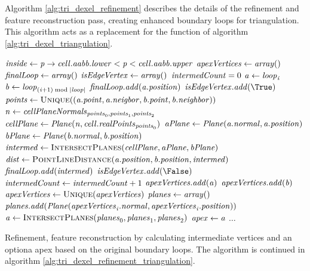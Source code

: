 Algorithm \ref{alg:tri_dexel_refinement} describes the details of the refinement and feature reconstruction pass, creating enhanced boundary loops for triangulation.
This algorithm acts as a replacement for the  function of algorithm \ref{alg:tri_dexel_triangulation}.
%
\begin{algorithm}
	\centering
	\begin{algorithmic}[1]
			\State $\mathit{inside} \gets \mathit{p} \rightarrow \mathit{cell}.\mathit{aabb}.\mathit{lower} < \mathit{p} < \mathit{cell}.\mathit{aabb}.\mathit{upper}$
			\State $\mathit{apexVertices} \gets \mathit{array}()$
			\State $\mathit{finalLoop} \gets \mathit{array}()$
			\State $\mathit{isEdgeVertex} \gets \mathit{array}()$
			\State $\mathit{intermedCount} = 0$
				\State $\mathit{a} \gets \mathit{loop}_{\mathit{i}}$
				\State $\mathit{b} \gets \mathit{loop}_{(\mathit{i} + 1) \bmod |\mathit{loop}|}$
				\State $\mathit{finalLoop}.\mathit{add}(\mathit{a}.\mathit{position})$
				\State $\var{isEdgeVertex}.\var{add}(\True)$
				\State $\var{points} \gets \Call{Unique}{(\var{a}.\var{point}, \var{a}.\var{neigbor}, \var{b}.\var{point}, \var{b}.\var{neighbor})}$
				\State $\mathit{n} \gets \mathit{cellPlaneNormals}_{\mathit{points}_0, \mathit{points}_1, \mathit{points}_2}$
				\State $\mathit{cellPlane} \gets \mathit{Plane}(\mathit{n}, \mathit{cell}.\mathit{realPoints}_{\mathit{points}_0})$
				\State $\mathit{aPlane} \gets \mathit{Plane}(\mathit{a}.\mathit{normal}, \mathit{a}.\mathit{position})$
				\State $\mathit{bPlane} \gets \mathit{Plane}(\mathit{b}.\mathit{normal}, \mathit{b}.\mathit{position})$
				\State $\var{intermed} \gets \Call{IntersectPlanes}{\var{cellPlane}, \var{aPlane}, \var{bPlane}}$
					\State $\var{dist} \gets \Call{PointLineDistance}{\var{a}.\var{position}, \var{b}.\var{position}, \var{intermed}}$
						\State $\mathit{finalLoop}.\mathit{add}(\mathit{intermed})$
						\State $\var{isEdgeVertex}.\var{add}(\False)$
						\State $\mathit{intermedCount} \gets \mathit{intermedCount} + 1$
						\State $\mathit{apexVertices}.\mathit{add}(\mathit{a})$
						\State $\mathit{apexVertices}.\mathit{add}(\mathit{b})$
					\EndIf
				\EndIf
			\EndFor
				\State $\var{apexVertices} \gets \Call{Unique}{\var{apexVertices}}$
				\State $\mathit{planes} \gets \mathit{array}()$
					\State $\mathit{planes}.\mathit{add}(\mathit{Plane}(\mathit{apexVertices}_{\mathit{i}}.\mathit{normal}, \mathit{apexVertices}_{\mathit{i}}.\mathit{position}))$
				\EndFor
				\State $\var{a} \gets \Call{IntersectPlanes}{\var{planes}_0, \var{planes}_1, \var{planes}_2}$
					\State $\mathit{apex} \gets \mathit{a}$
				\EndIf
			\EndIf
			\State $\dots$
	\end{algorithmic}
	\caption{
		Refinement, feature reconstruction by calculating intermediate vertices and an optiona apex based on the original boundary loops.
		The algorithm is continued in algorithm \ref{alg:tri_dexel_refinement_triangulation}.
	}
	\label{alg:tri_dexel_refinement}
\end{algorithm}
